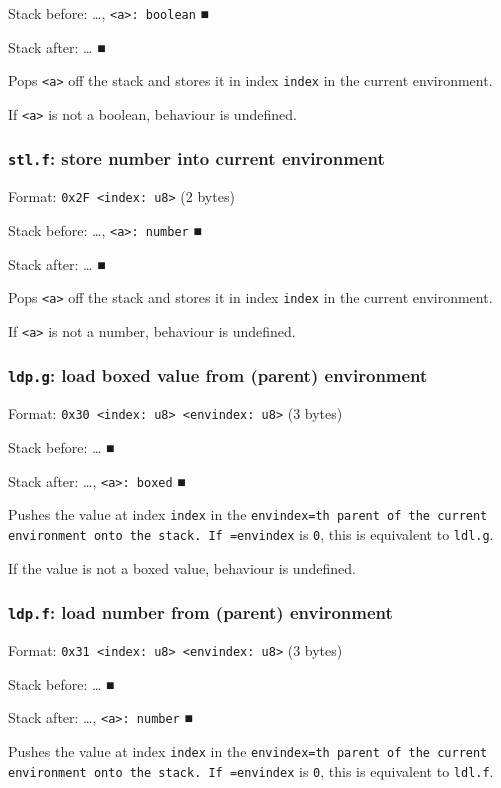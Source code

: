 Stack before: \ldots{}​, \texttt{<a>: boolean} ■

Stack after: \ldots{}​ ■

Pops \texttt{<a>} off the stack and stores it in index \texttt{index} in the current
environment.

If \texttt{<a>} is not a boolean, behaviour is undefined.

\subsubsection{\texttt{stl.f}: store number into current environment}
\label{sec:org29b23b4}
Format: \texttt{0x2F <index: u8>} (2 bytes)

Stack before: \ldots{}​, \texttt{<a>: number} ■

Stack after: \ldots{}​ ■

Pops \texttt{<a>} off the stack and stores it in index \texttt{index} in the current
environment.

If \texttt{<a>} is not a number, behaviour is undefined.

\subsubsection{\texttt{ldp.g}: load boxed value from (parent) environment}
\label{sec:org445285b}
Format: \texttt{0x30 <index: u8> <envindex: u8>} (3 bytes)

Stack before: \ldots{}​ ■

Stack after: \ldots{}​, \texttt{<a>: boxed} ■

Pushes the value at index \texttt{index} in the \texttt{envindex=th parent of the
current environment onto the stack. If =envindex} is \texttt{0}, this is
equivalent to \texttt{ldl.g}.

If the value is not a boxed value, behaviour is undefined.

\subsubsection{\texttt{ldp.f}: load number from (parent) environment}
\label{sec:orgf48099d}
Format: \texttt{0x31 <index: u8> <envindex: u8>} (3 bytes)

Stack before: \ldots{}​ ■

Stack after: \ldots{}​, \texttt{<a>: number} ■

Pushes the value at index \texttt{index} in the \texttt{envindex=th parent of the
current environment onto the stack. If =envindex} is \texttt{0}, this is
equivalent to \texttt{ldl.f}.


